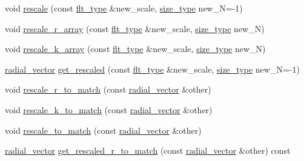 \begin{DoxyCompactItemize}
void \hyperlink{classIceBRG_1_1Fourier_1_1radial__vector_af31ac06ceedde33451b49bc8b6ae9649}{rescale} (const \hyperlink{lib_2IceBRG__main_2common_8h_ad0f130a56eeb944d9ef2692ee881ecc4}{flt\+\_\+type} \&new\+\_\+scale, \hyperlink{lib_2IceBRG__main_2common_8h_a566c61f2ca17211f4ba8557f3f65e8d3}{size\+\_\+type} new\+\_\+\+N=-\/1)
\item 
void \hyperlink{classIceBRG_1_1Fourier_1_1radial__vector_a10cf893a48dc6820af965aba77b2b5a3}{rescale\+\_\+r\+\_\+array} (const \hyperlink{lib_2IceBRG__main_2common_8h_ad0f130a56eeb944d9ef2692ee881ecc4}{flt\+\_\+type} \&new\+\_\+scale, \hyperlink{lib_2IceBRG__main_2common_8h_a566c61f2ca17211f4ba8557f3f65e8d3}{size\+\_\+type} new\+\_\+\+N)
\item 
void \hyperlink{classIceBRG_1_1Fourier_1_1radial__vector_a1dbd9d6401c92b1153e8bb3465b64a88}{rescale\+\_\+k\+\_\+array} (const \hyperlink{lib_2IceBRG__main_2common_8h_ad0f130a56eeb944d9ef2692ee881ecc4}{flt\+\_\+type} \&new\+\_\+scale, \hyperlink{lib_2IceBRG__main_2common_8h_a566c61f2ca17211f4ba8557f3f65e8d3}{size\+\_\+type} new\+\_\+\+N)
\item 
\hyperlink{classIceBRG_1_1Fourier_1_1radial__vector}{radial\+\_\+vector} \hyperlink{classIceBRG_1_1Fourier_1_1radial__vector_a4e49151ead8e7a4530086df93fa3136c}{get\+\_\+rescaled} (const \hyperlink{lib_2IceBRG__main_2common_8h_ad0f130a56eeb944d9ef2692ee881ecc4}{flt\+\_\+type} \&new\+\_\+scale, \hyperlink{lib_2IceBRG__main_2common_8h_a566c61f2ca17211f4ba8557f3f65e8d3}{size\+\_\+type} new\+\_\+\+N=-\/1)
\item 
void \hyperlink{classIceBRG_1_1Fourier_1_1radial__vector_a85242c4833d110bbdb4eee1ef8cd2ea9}{rescale\+\_\+r\+\_\+to\+\_\+match} (const \hyperlink{classIceBRG_1_1Fourier_1_1radial__vector}{radial\+\_\+vector} \&other)
\item 
void \hyperlink{classIceBRG_1_1Fourier_1_1radial__vector_a6e451a1867a8b2685cbb1319ecde882d}{rescale\+\_\+k\+\_\+to\+\_\+match} (const \hyperlink{classIceBRG_1_1Fourier_1_1radial__vector}{radial\+\_\+vector} \&other)
\item 
void \hyperlink{classIceBRG_1_1Fourier_1_1radial__vector_a108e3472bca3f9e98d99b617b9a85d5c}{rescale\+\_\+to\+\_\+match} (const \hyperlink{classIceBRG_1_1Fourier_1_1radial__vector}{radial\+\_\+vector} \&other)
\item 
\hyperlink{classIceBRG_1_1Fourier_1_1radial__vector}{radial\+\_\+vector} \hyperlink{classIceBRG_1_1Fourier_1_1radial__vector_ae3a1fa92b3c127c0489dd4dcb4bd164e}{get\+\_\+rescaled\+\_\+r\+\_\+to\+\_\+match} (const \hyperlink{classIceBRG_1_1Fourier_1_1radial__vector}{radial\+\_\+vector} \&other) const 

\end{DoxyCompactItemize}
